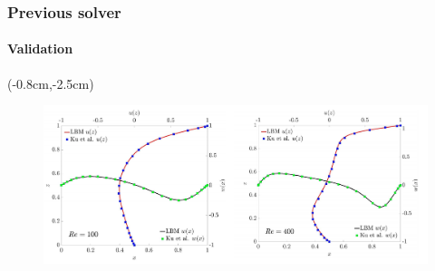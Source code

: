 \documentclass[xcolor=table]{beamer}
\begin{document}
						\begin{frame}
							\frametitle{Previous solver}
							\framesubtitle{Validation}
							\begin{textblock*}{5cm}(-0.8cm,-2.5cm)
							\begin{figure}
								\includegraphics[scale=0.215]{Resources/prevValid.png}
							\end{figure}
							\end{textblock*}
						\end{frame}
\end{document}
